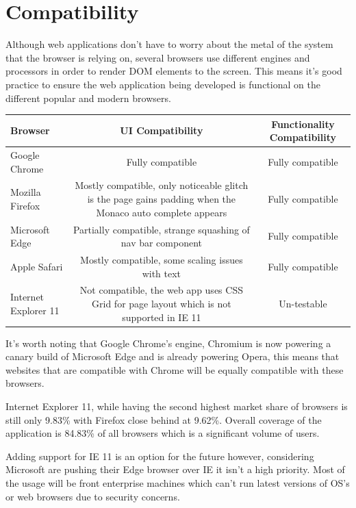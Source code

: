 

\section{Compatibility}

Although web applications don't have to worry about the metal of the system that the browser is relying on, several browsers use different engines and processors in order to render DOM elements to the screen. This means it's good practice to ensure the web application being developed is functional on the different popular and modern browsers.

\begin{table}[h]
    \centering
    \begin{tabulary}{\textwidth}{l|C|c}
        \textbf{Browser} & \textbf{UI Compatibility} & \textbf{Functionality Compatibility} \\
        \hline
        Google Chrome & Fully compatible & Fully compatible \\
        \hline
        Mozilla Firefox & Mostly compatible, only noticeable glitch is the page gains padding when the Monaco auto complete appears & Fully compatible \\
        \hline
        Microsoft Edge & Partially compatible, strange squashing of nav bar component & Fully compatible \\
        \hline
        Apple Safari & Mostly compatible, some scaling issues with text & Fully compatible \\
        \hline
        Internet Explorer 11 & Not compatible, the web app uses CSS Grid for page layout which is not supported in IE 11 & Un-testable
    \end{tabulary}
\end{table}

It's worth noting that Google Chrome's engine, Chromium is now powering a canary build of Microsoft Edge and is already powering Opera, this means that websites that are compatible with Chrome will be equally compatible with these browsers.  

Internet Explorer 11, while having the second highest market share of browsers \cite{browser-stats} is still only 9.83\% with Firefox close behind at 9.62\%. Overall coverage of the application is 84.83\% of all browsers which is a significant volume of users.

Adding support for IE 11 is an option for the future however, considering Microsoft are pushing their Edge browser over IE it isn't a high priority. Most of the usage will be front enterprise machines which can't run latest versions of OS's or web browsers due to security concerns.

